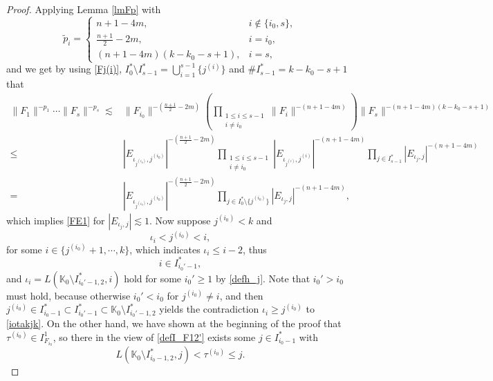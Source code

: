 \documentclass[11pt,reqno]{amsart}
\def\i{{\rm i}}
\numberwithin{equation}{section}
\theoremstyle{definition}
\begin{document}
\begin{proof}
	Applying Lemma \ref{lmFp} with
	\begin{equation*}
		\tilde{p}_i=\begin{cases}
			n+1-4m,\quad&i\notin\{i_0,s\},\\
			\frac{n+1}{2}-2m,&i=i_0,\\
			(n+1-4m)(k-k_0-s+1),&i=s,
		\end{cases}
	\end{equation*}
	and we get by using \eqref{Fj(i)}, $I_0^*\setminus I_{s-1}^*=\bigcup_{i=1}^{s-1}\{j^{(i)}\}$ and $\# I_{s-1}^*=k-k_0-s+1$ that
	\begin{equation}\label{Ficontrol1}
		\begin{split}
			\|F_1\|^{-p_1}\cdots\|F_s\|^{-p_s}\lesssim&\|F_{i_0}\|^{-(\frac{n+1}{2}-2m)}\left(\prod_{\substack{1\leq i\leq s-1\\i\neq i_0}}\|F_i\|^{-(n+1-4m)}\right)\|F_s\|^{-(n+1-4m)(k-k_0-s+1)}\\
			\leq&|E_{\iota_{j^{(i_0)}},j^{(i_0)}}|^{-(\frac{n+1}{2}-2m)}\prod_{\substack{1\leq i\leq s-1\\i\neq i_0}}|E_{\iota_{j^{(i)}},j^{(i)}}|^{-(n+1-4m)}\prod_{j\in I_{s-1}^*}|E_{\iota_j,j}|^{-(n+1-4m)}\\
			=&|E_{\iota_{j^{(i_0)}},j^{(i_0)}}|^{-(\frac{n+1}{2}-2m)}\prod_{j\in I_0^*\setminus\{j^{(i_0)}\}}|E_{\iota_j,j}|^{-(n+1-4m)},
		\end{split}
	\end{equation}
	which implies \eqref{FE1} for $|E_{\iota_j,j}|\lesssim1$. Now suppose $j^{(i_0)}<k$ and
	\begin{equation}\label{iotakjk}
		\iota_i<j^{(i_0)}<i,
	\end{equation}
	for some $i\in\{j^{(i_0)}+1,\cdots,k\}$, which indicates $\iota_i\leq i-2$, thus
	\begin{equation}\label{iinIi_0'-1*}
		i\in I_{i_0'-1}^*,
	\end{equation}
	and $\iota_i=L(\mathbb{K}_0\setminus I_{i_0'-1,2}^*,i)$ hold for some $i_0'\geq1$ by \eqref{defh_j}. Note that $i_0'>i_0$ must hold, because otherwise $i_0'<i_0$ for $j^{(i_0)}\neq i$, and then $j^{(i_0)}\in I_{i_0-1}^*\subset I_{i_0'-1}^*\subset\mathbb{K}_0\setminus I_{i_0'-1,2}^*$ yields the contradiction $\iota_i\geq j^{(i_0)}$ to \eqref{iotakjk}. On the other hand, we have shown at the beginning of the proof that $\tau^{(i_0)}\in I_{F_{i_0}}^1$, so there in the view of \eqref{defI_F12'} exists some $j\in I_{i_0-1}^*$ with
	\begin{equation}\label{taui_0range}
		L(\mathbb{K}_0\setminus I_{i_0-1,2}^*,j)<\tau^{(i_0)}\leq j.

\end{equation}
\end{proof}
\end{document}

